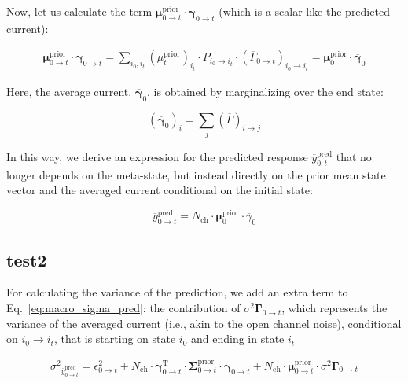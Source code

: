 \documentclass[pdflatex,sn-mathphys-num]{sn-jnl}%
\theoremstyle{thmstyleone}%
\theoremstyle{thmstyletwo}%
\theoremstyle{thmstylethree}%
\begin{document}
Now, let us calculate the term \( \mathbf{\mu}^{\text{prior}}_{0 \rightarrow t} \cdot \mathbf{\gamma}_{0 \rightarrow t} \) (which is a scalar like the predicted current):

\begin{multline}
	\mathbf{\mu}^{\text{prior}}_{0 \rightarrow t} \cdot \mathbf{\gamma}_{0 \rightarrow t} =
	\sum_{i_0, i_t} (\mu^{\text{prior}}_{t})_{i_t} \cdot P_{i_0 \rightarrow i_t} \cdot (\overline{\Gamma}_{0 \rightarrow t})_{i_0 \rightarrow i_t}
	= \mathbf{\mu}^{\text{prior}}_{0} \cdot \overline{\mathbf{\gamma}}_{0}
\end{multline}

Here, the average current, \( \overline{\mathbf{\gamma}}_{0} \), is obtained by marginalizing over the end state:

\begin{equation}
	(\overline{\mathbf{\gamma}}_{0})_i = \sum_j (\overline{\Gamma})_{i \rightarrow j}
\end{equation}

In this way, we derive an expression for the predicted response \( \overline{y}^{\text{pred}}_{0,t} \) that no longer depends on the meta-state, but instead directly on the prior mean state vector and the averaged current conditional on the initial state:

\begin{equation}
	\overline{y}^{\text{pred}}_{0 \rightarrow t} = N_{\text{ch}} \cdot \mathbf{\mu}^{\text{prior}}_{0} \cdot \overline{\gamma}_{0}
	\label{eq:macro_interval_predicted_y}
\end{equation}

\subsection{test2}

For calculating the variance of the prediction, we add an extra term to Eq.~\ref{eq:macro_sigma_pred}: the contribution of ${\sigma^2 \mathbf{\Gamma}}_{0 \rightarrow t}$, which represents the variance of the averaged current (i.e., akin to the open channel noise), conditional on $i_0 \rightarrow i_t$, that is starting on state $i_0$ and ending in state $i_t$

\begin{equation}
	{\sigma^2}_{\overline{y}^{\mathrm{pred}}_{0 \rightarrow t}}
	= \epsilon^2_{0 \rightarrow t} + N_{\mathrm{ch}} \cdot \mathbf{\gamma}^{\mathrm{T}}_{0 \rightarrow t} \cdot \mathbf{\Sigma}^{\mathrm{prior}}_{0 \rightarrow t} \cdot \mathbf{\gamma}_{0 \rightarrow t}
	+ N_{\mathrm{ch}} \cdot \mathbf{\mu}^{\mathrm{prior}}_{0 \rightarrow t} \cdot {\sigma^2 \mathbf{\Gamma}}_{0 \rightarrow t}
	\label{eq:meta_macro_sigma_pred}
\end{equation}
\end{document}
